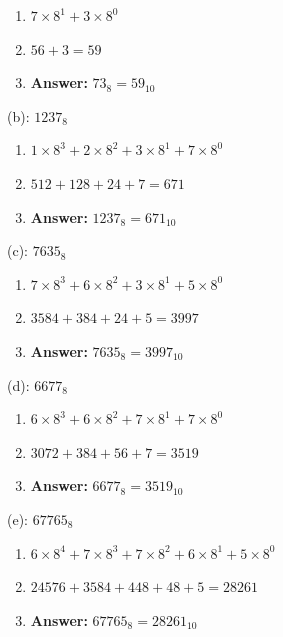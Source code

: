 \documentclass{article}
\begin{document}
\begin{enumerate}
    \item $7 \times 8^1 + 3 \times 8^0$
    \item $56 + 3 = 59$
    \item \textbf{Answer:} $73_8 = 59_{10}$
\end{enumerate}

\vspace*{0.5cm}

\noindent (b): $1237_8$

\begin{enumerate}
    \item $1 \times 8^3 + 2 \times 8^2 + 3 \times 8^1 + 7 \times 8^0$
    \item $512 + 128 + 24 + 7 = 671$
    \item \textbf{Answer:} $1237_8 = 671_{10}$
\end{enumerate}

\newpage

\noindent (c): $7635_8$

\begin{enumerate}
    \item $7 \times 8^3 + 6 \times 8^2 + 3 \times 8^1 + 5 \times 8^0$
    \item $3584 + 384 + 24 + 5 = 3997$
    \item \textbf{Answer:} $7635_8 = 3997_{10}$
\end{enumerate}

\vspace*{0.5cm}

\noindent (d): $6677_8$

\begin{enumerate}
    \item $6 \times 8^3 + 6 \times 8^2 + 7 \times 8^1 + 7 \times 8^0$
    \item $3072 + 384 + 56 + 7 = 3519$
    \item \textbf{Answer:} $6677_8 = 3519_{10}$
\end{enumerate}

\vspace*{0.5cm}

\noindent (e): $67765_8$

\begin{enumerate}
    \item $6 \times 8^4 + 7 \times 8^3 + 7 \times 8^2 + 6 \times 8^1 + 5 \times 8^0$
    \item $24576 + 3584 + 448 + 48 + 5 = 28261$
    \item \textbf{Answer:} $67765_8 = 28261_{10}$
\end{enumerate}
\end{document}

